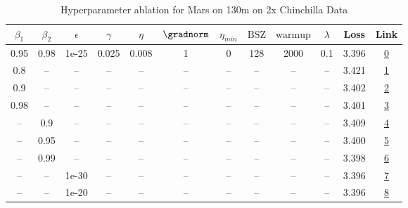 \begin{table}[H]
\centering
\caption{Hyperparameter ablation for Mars on 130m on 2x Chinchilla Data}
\label{tab:ablation_mars_130m_on_2x_chinchilla_data}
\begin{tabular}{cccccccccccc}
\toprule
$\beta_1$ & $\beta_2$ & $\epsilon$ & $\gamma$ & $\eta$ & $\gradnorm$ & $\eta_{min}$ & $\mathrm{BSZ}$ & $\mathrm{warmup}$ & $\lambda$ & Loss & Link \\
\midrule
0.95 & 0.98 & 1e-25 & 0.025 & 0.008 & 1 & 0 & 128 & 2000 & 0.1 & 3.396 & \href{https://wandb.ai/stanford-mercury/optimizer-scaling/runs/sweep-130m-5B-marsc95aa3lr0.008-wd0.1-minlr0-warmup2000-b10.95-b-7a23c5}{0} \\
\midrule
0.8 & -- & -- & -- & -- & -- & -- & -- & -- & -- & 3.421 & \href{https://wandb.ai/stanford-mercury/optimizer-scaling/runs/sweep-130m-5B-marscd02f0lr0.008-wd0.1-minlr0-warmup2000-b10.8-b2-4592bf}{1} \\
0.9 & -- & -- & -- & -- & -- & -- & -- & -- & -- & 3.402 & \href{https://wandb.ai/stanford-mercury/optimizer-scaling/runs/sweep-130m-5B-marspfd075dlr0.008-wd0.1-minlr0-warmup2000-b10.9-b-b40465}{2} \\
0.98 & -- & -- & -- & -- & -- & -- & -- & -- & -- & 3.401 & \href{https://wandb.ai/stanford-mercury/optimizer-scaling/runs/sweep-130m-5B-marsc8034dlr0.008-wd0.1-minlr0-warmup2000-b10.98-b-a89aca}{3} \\
-- & 0.9 & -- & -- & -- & -- & -- & -- & -- & -- & 3.409 & \href{https://wandb.ai/stanford-mercury/optimizer-scaling/runs/sweep-130m-5B-mars58007elr0.008-wd0.1-minlr0-warmup2000-b10.95-b-a6ce83}{4} \\
-- & 0.95 & -- & -- & -- & -- & -- & -- & -- & -- & 3.400 & \href{https://wandb.ai/stanford-mercury/optimizer-scaling/runs/sweep-130m-5B-marspa9b599lr0.008-wd0.1-minlr0-warmup2000-b10.95--0ab9b0}{5} \\
-- & 0.99 & -- & -- & -- & -- & -- & -- & -- & -- & 3.398 & \href{https://wandb.ai/stanford-mercury/optimizer-scaling/runs/sweep-130m-5B-mars104ea4lr0.008-wd0.1-minlr0-warmup2000-b10.95-b-ce96d6}{6} \\
-- & -- & 1e-30 & -- & -- & -- & -- & -- & -- & -- & 3.396 & \href{https://wandb.ai/stanford-mercury/optimizer-scaling/runs/sweep-130m-5B-marsc95aa3lr0.008-wd0.1-minlr0-warmup2000-b10.95-b-7a23c5}{7} \\
-- & -- & 1e-20 & -- & -- & -- & -- & -- & -- & -- & 3.396 & \href{https://wandb.ai/stanford-mercury/optimizer-scaling/runs/sweep-130m-5B-marsfe50f8lr0.008-wd0.1-minlr0-warmup2000-b10.95-b-93f048}{8} \\

\end{tabular}
\end{table}
